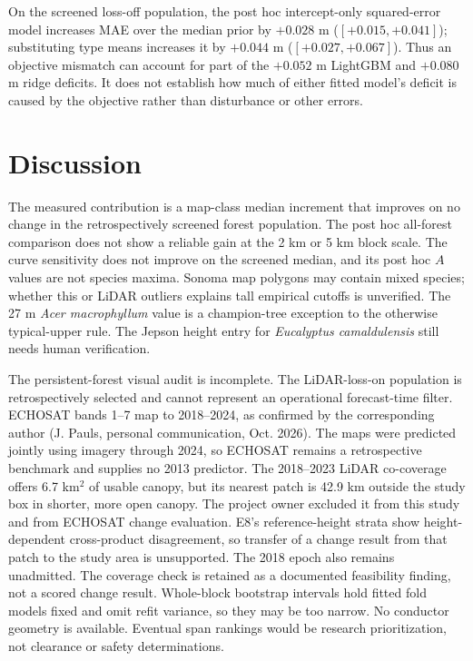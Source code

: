 \documentclass[11pt]{article}
\begin{document}
On the screened loss-off population, the post hoc intercept-only
squared-error model increases MAE over the median prior by $+0.028$ m
($[+0.015,+0.041]$); substituting type means increases it by
$+0.044$ m ($[+0.027,+0.067]$). Thus an objective mismatch can account
for part of the $+0.052$ m LightGBM and $+0.080$ m ridge deficits.
It does not establish how much of either fitted model's deficit is
caused by the objective rather than disturbance or other errors.

\section{Discussion}
The measured contribution is a map-class median increment that improves
on no change in the retrospectively screened forest population. The
post hoc all-forest comparison does not show a reliable gain at the
2 km or 5 km block scale. The curve sensitivity does not improve on
the screened median, and its post hoc $A$ values are not species
maxima. Sonoma map
polygons may contain mixed species; whether this or LiDAR outliers
explains tall empirical cutoffs is unverified. The 27 m
\emph{Acer macrophyllum} value is a champion-tree exception to the
otherwise typical-upper rule. The Jepson height entry for
\emph{Eucalyptus camaldulensis} still needs human verification.

The persistent-forest visual audit is incomplete. The LiDAR-loss-on
population is retrospectively selected and cannot represent an
operational forecast-time filter. ECHOSAT bands 1--7 map to
2018--2024, as confirmed by the corresponding author (J. Pauls,
personal communication, Oct. 2026). The maps were predicted jointly
using imagery through 2024, so ECHOSAT remains a retrospective
benchmark and supplies no 2013 predictor.
The 2018--2023 LiDAR co-coverage offers 6.7 km$^2$ of usable canopy,
but its nearest patch is 42.9 km outside the study box in shorter,
more open canopy. The project owner excluded it from this study and
from ECHOSAT change evaluation. E8's reference-height strata show
height-dependent cross-product disagreement, so transfer of a change
result from that patch to the study area is unsupported. The 2018
epoch also remains unadmitted. The coverage check is retained as a
documented feasibility finding, not a scored change result.
Whole-block bootstrap intervals hold fitted fold models fixed and
omit refit variance, so they may be too narrow. No conductor
geometry is available. Eventual span rankings would be research
prioritization, not clearance or safety determinations.
\end{document}
